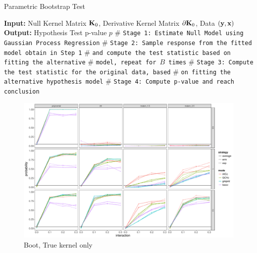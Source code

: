 \documentclass[11pt]{article}
\begin{document}
\begin{algorithm}
\caption{Parametric Bootstrap Test} 
\label{alg:cvek}
\begin{algorithmic}[1]
\newline
\textbf{Input:} Null Kernel Matrix ${\bf K}_0$, Derivative Kernel Matrix $\partial {\bf K}_0$, Data $({\bf y}, {\bf x})$\newline
\textbf{Output:} Hypothesis Test p-value $p$\newline
$\#$ \texttt{Stage 1: Estimate Null Model using Gaussian Process Regression}
\newline
$\#$ \texttt{Stage 2: Sample response from the fitted model obtain in Step 1}
\newline
$\#$ \texttt{and compute the test statistic based on fitting the alternative}
\newline
$\#$ \texttt{model, repeat for $B$ times}
\EndFor 
\newline
$\#$ \texttt{Stage 3: Compute the test statistic for the original data, based}
\newline
$\#$ \texttt{on fitting the alternative hypothesis model}
\newline
$\#$ \texttt{Stage 4: Compute p-value and reach conclusion}
\EndProcedure
\end{algorithmic}
\end{algorithm}

\clearpage


\begin{figure}
\begin{center}
\includegraphics[width=0.9\columnwidth]{B1} 
\caption{Boot, True kernel only}
\label{fig:res}
\end{center}
\end{figure}
\end{document}
